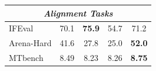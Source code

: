 \begin{table}[t]
\begin{tabular}{@{}lcccc@{}}
\midrule

\multicolumn{5}{c}{\textit{Alignment Tasks}} \\

\midrule

IFEval & 70.1 & \textbf{75.9} & 54.7 & 71.2 \\

Arena-Hard & 41.6 & 27.8 & 25.0 & \textbf{52.0} \\


MTbench & 8.49 & 8.23 & 8.26 & \textbf{8.75} \\

\bottomrule

\end{tabular}

\end{table}





